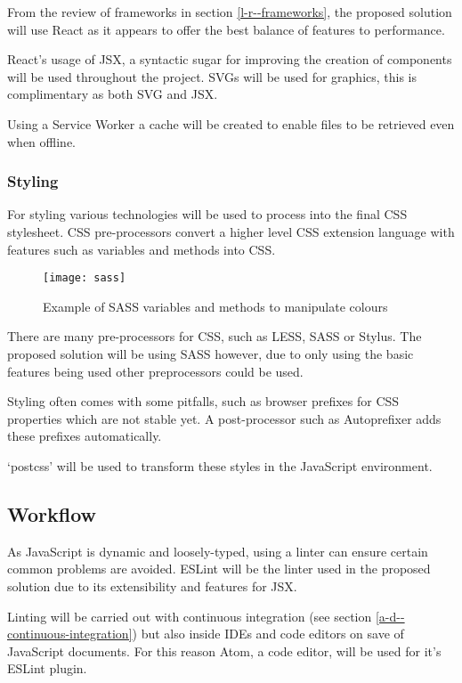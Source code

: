 From the review of frameworks in section \ref{l-r--frameworks}, the proposed solution will use React as it appears to offer the best balance of features to performance.

React's usage of JSX, a syntactic sugar for improving the creation of components will be used throughout the project. SVGs will be used for graphics, this is complimentary as both SVG and JSX. \cite{jsx}

Using a Service Worker a cache will be created to enable files to be retrieved even when offline.

\subsubsection{Styling} \label{a-d--t--styling}
For styling various technologies will be used to process into the final CSS stylesheet. CSS pre-processors convert a higher level CSS extension language with features such as variables and methods into CSS.

\begin{figure}[H]
  \centering
    \texttt{[image: sass]}
  \caption{Example of SASS variables and methods to manipulate colours}
  \label{figure-sass}
\end{figure}

There are many pre-processors for CSS, such as LESS, SASS or Stylus. The proposed solution will be using SASS however, due to only using the basic features being used other preprocessors could be used. \cite{SASS}

Styling often comes with some pitfalls, such as browser prefixes for CSS properties which are not stable yet. A post-processor such as Autoprefixer adds these prefixes automatically. \cite{autoprefixer}

`postcss' will be used to transform these styles in the JavaScript environment. \cite{postcss}

\subsection{Workflow} \label{a-d--workflow}

As JavaScript is dynamic and loosely-typed, using a linter can ensure certain common problems are avoided. ESLint will be the linter used in the proposed solution due to its extensibility and features for JSX. \cite{eslint}

Linting will be carried out with continuous integration (see section \ref{a-d--continuous-integration}) but also inside IDEs and code editors on save of JavaScript documents. For this reason Atom, a code editor, will be used for it's ESLint plugin.


